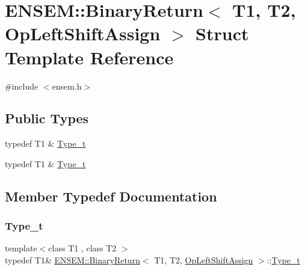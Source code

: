 \hypertarget{structENSEM_1_1BinaryReturn_3_01T1_00_01T2_00_01OpLeftShiftAssign_01_4}{}\section{E\+N\+S\+EM\+:\+:Binary\+Return$<$ T1, T2, Op\+Left\+Shift\+Assign $>$ Struct Template Reference}
\label{structENSEM_1_1BinaryReturn_3_01T1_00_01T2_00_01OpLeftShiftAssign_01_4}


{\ttfamily \#include $<$ensem.\+h$>$}

\subsection*{Public Types}
\begin{DoxyCompactItemize}
\item 
typedef T1 \& \mbox{\hyperlink{structENSEM_1_1BinaryReturn_3_01T1_00_01T2_00_01OpLeftShiftAssign_01_4_a86e3783b9979825629679e9fc7023298}{Type\+\_\+t}}
\item 
typedef T1 \& \mbox{\hyperlink{structENSEM_1_1BinaryReturn_3_01T1_00_01T2_00_01OpLeftShiftAssign_01_4_a86e3783b9979825629679e9fc7023298}{Type\+\_\+t}}
\end{DoxyCompactItemize}


\subsection{Member Typedef Documentation}
\mbox{\label{structENSEM_1_1BinaryReturn_3_01T1_00_01T2_00_01OpLeftShiftAssign_01_4_a86e3783b9979825629679e9fc7023298}} 
\subsubsection{\texorpdfstring{Type\_t}{Type\_t}\hspace{0.1cm}{\footnotesize\ttfamily [1/2]}}
{\footnotesize\ttfamily template$<$class T1 , class T2 $>$ \\
typedef T1\& \mbox{\hyperlink{structENSEM_1_1BinaryReturn}{E\+N\+S\+E\+M\+::\+Binary\+Return}}$<$ T1, T2, \mbox{\hyperlink{structENSEM_1_1OpLeftShiftAssign}{Op\+Left\+Shift\+Assign}} $>$\+::\mbox{\hyperlink{structENSEM_1_1BinaryReturn_3_01T1_00_01T2_00_01OpLeftShiftAssign_01_4_a86e3783b9979825629679e9fc7023298}{Type\+\_\+t}}}

